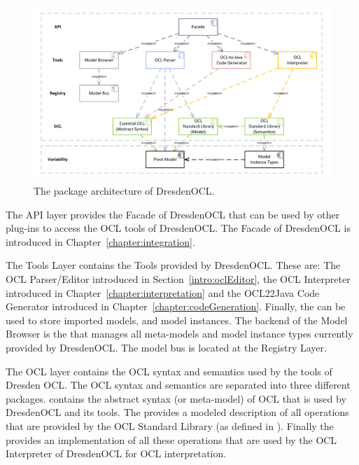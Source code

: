 \begin{figure}[!b]
	\centering
	\includegraphics[width=1.0\linewidth]{figures/architecture/modules}
	\caption{The package architecture of DresdenOCL.}
	\label{pic:architecture:modules}
\end{figure}

The API layer provides the Facade of DresdenOCL that can be used by other
plug-ins to access the \acs{OCL} tools of DresdenOCL. The Facade of DresdenOCL
is introduced in Chapter~\ref{chapter:integration}.

The Tools Layer contains the Tools provided by DresdenOCL. These are: The
\acs{OCL} Parser/Editor introduced in Section~\ref{intro:oclEditor}, the
\acs{OCL} Interpreter introduced in Chapter~\ref{chapter:interpretation} and the
\acs{OCL}22Java Code Generator introduced in
Chapter~\ref{chapter:codeGeneration}. Finally, the  can
be used to store imported models, and model instances. The backend of the Model
Browser is the  that manages all meta-models and model
instance types currently provided by DresdenOCL. The model bus is located at the
Registry Layer.

The \acs{OCL} layer contains the \acs{OCL} syntax and semantics used by the
tools of Dresden OCL. The \acs{OCL} syntax and semantics are separated into
three different packages.  contains the abstract syntax
(or meta-model) of \acs{OCL} that is used by DresdenOCL and its tools. The
 provides a modeled description of all
operations that are provided by the \acs{OCL} Standard Library (as defined in
\cite[Ch.~11]{spec:OCL2-2}). Finally the  provides an implementation of all these operations that are used by
the \acs{OCL} Interpreter of DresdenOCL for \acs{OCL} interpretation.

